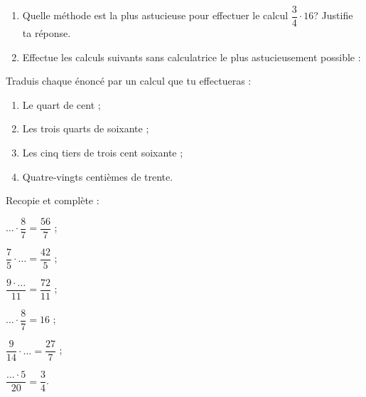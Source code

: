 \begin{exercice}[Astucieusement]
\begin{enumerate}
 \item Quelle méthode est la plus astucieuse pour effectuer le calcul $\dfrac{3}{4} \cdot 16$? Justifie ta réponse.
 \item Effectue les calculs suivants sans calculatrice le plus astucieusement possible :
 \end{enumerate}
\end{exercice}


\begin{exercice}
Traduis chaque énoncé par un calcul que tu effectueras :
\begin{enumerate}
 \item Le quart de cent ;
 \item Les trois quarts de soixante ;
 \item Les cinq tiers de trois cent soixante ;
 \item Quatre‑vingts centièmes de trente.
 \end{enumerate}
\end{exercice}


\begin{exercice}
Recopie et complète :
 \begin{colenumerate}{2}
  \item $\ldots \cdot \dfrac{8}{7} = \dfrac{56}{7}$ ;
  \vspace{0.2cm}
  \item $\dfrac{7}{5} \cdot \ldots = \dfrac{42}{5}$ ;
  \vspace{0.2cm}
  \item $\dfrac{9 \cdot \ldots}{11} = \dfrac{72}{11}$ ;
  \item $\ldots \cdot \dfrac{8}{7} = 16$ ;
  \item $\dfrac{9}{14} \cdot \ldots = \dfrac{27}{7}$ ;
  \item $\dfrac{\ldots \cdot 5}{20} = \dfrac{3}{4}$.
 \end{colenumerate}
\end{exercice}


